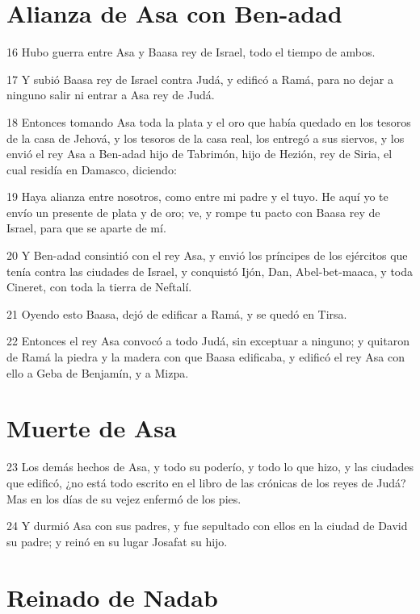 \section*{Alianza de Asa con Ben-adad}

\par 16 Hubo guerra entre Asa y Baasa rey de Israel, todo el tiempo de ambos.
\par 17 Y subió Baasa rey de Israel contra Judá, y edificó a Ramá, para no dejar a ninguno salir ni entrar a Asa rey de Judá.
\par 18 Entonces tomando Asa toda la plata y el oro que había quedado en los tesoros de la casa de Jehová, y los tesoros de la casa real, los entregó a sus siervos, y los envió el rey Asa a Ben-adad hijo de Tabrimón, hijo de Hezión, rey de Siria, el cual residía en Damasco, diciendo:
\par 19 Haya alianza entre nosotros, como entre mi padre y el tuyo. He aquí yo te envío un presente de plata y de oro; ve, y rompe tu pacto con Baasa rey de Israel, para que se aparte de mí.
\par 20 Y Ben-adad consintió con el rey Asa, y envió los príncipes de los ejércitos que tenía contra las ciudades de Israel, y conquistó Ijón, Dan, Abel-bet-maaca, y toda Cineret, con toda la tierra de Neftalí.
\par 21 Oyendo esto Baasa, dejó de edificar a Ramá, y se quedó en Tirsa.
\par 22 Entonces el rey Asa convocó a todo Judá, sin exceptuar a ninguno; y quitaron de Ramá la piedra y la madera con que Baasa edificaba, y edificó el rey Asa con ello a Geba de Benjamín, y a Mizpa.

\section*{Muerte de Asa}

\par 23 Los demás hechos de Asa, y todo su poderío, y todo lo que hizo, y las ciudades que edificó, ¿no está todo escrito en el libro de las crónicas de los reyes de Judá? Mas en los días de su vejez enfermó de los pies.
\par 24 Y durmió Asa con sus padres, y fue sepultado con ellos en la ciudad de David su padre; y reinó en su lugar Josafat su hijo.

\section*{Reinado de Nadab}

